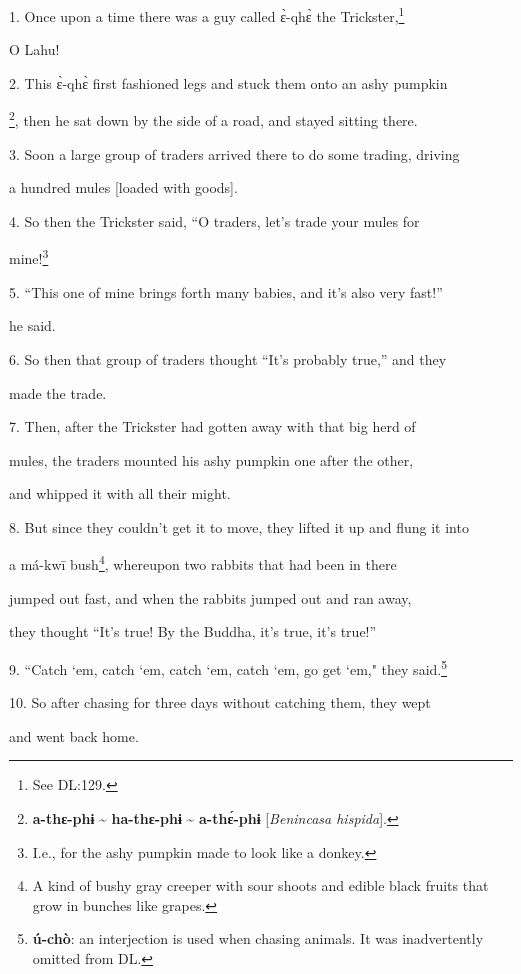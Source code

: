 \setcounter{footnote}{0}

1. Once upon a time there was a guy called ɛ̀-qhɛ̀ the Trickster,\footnote{See DL:129.}

O Lahu!

2. This ɛ̀-qhɛ̀ first fashioned legs and stuck them onto an ashy pumpkin


\footnote{\textbf{a-thɛ-phɨ} \textasciitilde{} \textbf{ha-thɛ-phɨ} \textasciitilde{} \textbf{a-thɛ́-phɨ} [\textit{Benincasa hispida}].}, then he sat down by the side of a road, and stayed sitting there.

3. Soon a large group of traders arrived there to do some trading, driving

a hundred mules [loaded with goods].

4. So then the Trickster said, ``O traders, let's trade your mules for

mine!\footnote{I.e., for the ashy pumpkin made to look like a donkey.}

5. ``This one of mine brings forth many babies, and it's also very fast!''

he said.

6. So then that group of traders thought ``It's probably true,'' and they

made the trade.

7. Then, after the Trickster had gotten away with that big herd of

mules, the traders mounted his ashy pumpkin one after the other,

and whipped it with all their might.

8. But since they couldn't get it to move, they lifted it up and flung it into


a má-kwī bush\footnote{A kind of bushy gray creeper with sour shoots and edible black fruits that grow in bunches like grapes.}, whereupon two rabbits that had been in there

jumped out fast, and when the rabbits jumped out and ran away,

they thought ``It's true! By the Buddha, it's true, it's true!''

9. ``Catch `em, catch `em, catch `em, catch `em, go get `em," they said.\footnote{\textbf{ú-chò}: an interjection is used when chasing animals. It was inadvertently omitted from DL.}

10. So after chasing for three days without catching them, they wept

and went back home.

